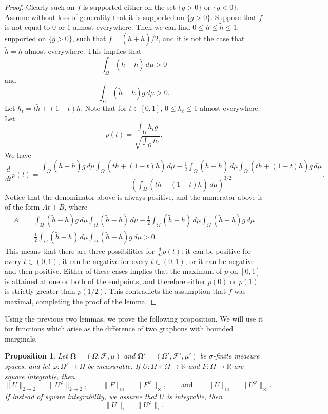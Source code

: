 \documentclass{amsart}
\numberwithin{equation}{section}
\numberwithin{figure}{section}
\newtheorem{proposition}[theorem]{Proposition}
\theoremstyle{definition}
\theoremstyle{remark}
\newcommand{\wth}{\widetilde{h}}
\newcommand{\jbl}{{\boxtimes}}
\newcommand{\bOmega}{{\mathbf{\Omega}}}
\newcommand{\RR}{\mathbb{R}}
\newcommand{\cF}{\mathcal{F}}
\begin{document}
\begin{proof}
Clearly such an $f$ is supported either on the set $\{g>0\}$ or $\{g<0\}$.
Assume without loss of generality that it is supported on $\{g>0\}$. Suppose
that $f$ is not equal to $0$ or $1$ almost everywhere. Then we can find $0
\le h \le \wth \le 1$, supported on $\{g>0\}$, such that $f=(\wth+h)/2$, and
it is not the case that $\wth=h$ almost everywhere. This implies that
\[\int_\Omega (\wth - h) \,d\mu >0
\]
and
\[\int_\Omega (\wth - h)g \,d\mu > 0.
\]
Let $h_t=t\wth+(1-t)h$. Note that for $t \in [0,1]$, $0 \le h_t \le 1$
almost everywhere. Let
\[p(t)= \frac{\int_\Omega h_t g}{\sqrt{\int_\Omega h_t}}.
\]
We have
\[\frac{d}{dt}p(t)=\frac{\int_\Omega (\wth-h)g \,d\mu \int_\Omega(t\wth+(1-t)h) \,d\mu
- \frac{1}{2} \int_\Omega( \wth-h)\,d\mu \int_\Omega(t\wth+(1-t)h)g \,d\mu}{\left(\int_\Omega(t\wth+(1-t)h)\,d\mu\right)^{3/2}}.
\]
Notice that the denominator above is always positive, and the numerator above
is of the form $At+B$, where
\begin{align*}
A&=\int_\Omega (\wth-h)g \,d\mu \int_\Omega (\wth-h) \,d\mu - \frac{1}{2} \int_\Omega(\wth-h) \,d\mu \int_\Omega (\wth-h)g \,d\mu\\
&=\frac{1}{2} \int_\Omega(\wth-h) \,d\mu \int_\Omega (\wth-h)g \,d\mu >0
.
\end{align*}
This means that there are three possibilities for $\frac{d}{dt}p(t)$: it can
be positive for every $t \in (0,1)$, it can be negative for every $t \in
(0,1)$, or it can be negative and then positive. Either of these cases
implies that the maximum of $p$ on $[0,1]$ is attained at one or both of the
endpoints, and therefore either $p(0)$ or $p(1)$ is strictly greater than
$p(1/2)$. This contradicts the assumption that $f$ was maximal, completing
the proof of the lemma.
\end{proof}

Using the previous two lemmas, we prove the following proposition. We will
use it for functions which arise as the difference of two graphons with
bounded marginals.

\begin{proposition} \label{proppullbacknormsame}
Let $\bOmega=(\Omega, \cF,\mu)$ and $\bOmega'=(\Omega',\cF',\mu')$ be
$\sigma$-finite measure spaces, and let $\varphi\colon\Omega' \rightarrow
\Omega$ be measurable. If $U\colon\Omega \times \Omega\to\RR$ and
$F\colon\Omega\to \RR$ are square integrable, then
\[
\|U\|_{2 \rightarrow 2}=\|U^\varphi\|_{2 \rightarrow 2},
\qquad\|F\|_{{\jbl}}=\|F^\varphi\|_\jbl,
\qquad\text{and}\qquad
\|U\|_{{\jbl}}=\|U^\varphi\|_{{\jbl}}.
\]
If instead of square integrability, we assume that $U$ is integrable, then
\[
\|U\|_{\square}=\|U^\varphi\|_{\square}.
\]
\end{proposition}
\end{document}

